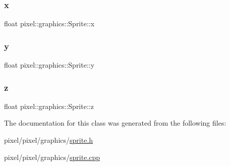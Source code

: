 \subsubsection{\texorpdfstring{x}{x}}
{\footnotesize\ttfamily float pixel\+::graphics\+::\+Sprite\+::x}

\mbox{\label{classpixel_1_1graphics_1_1_sprite_a0ffb75d6a489e6ce3ba76027389d11dd}} 
\subsubsection{\texorpdfstring{y}{y}}
{\footnotesize\ttfamily float pixel\+::graphics\+::\+Sprite\+::y}

\mbox{\label{classpixel_1_1graphics_1_1_sprite_aab4803301c8480b03ab6a62370753694}} 
\subsubsection{\texorpdfstring{z}{z}}
{\footnotesize\ttfamily float pixel\+::graphics\+::\+Sprite\+::z}



The documentation for this class was generated from the following files\+:\begin{DoxyCompactItemize}
\item 
pixel/pixel/graphics/\hyperlink{sprite_8h}{sprite.\+h}\item 
pixel/pixel/graphics/\hyperlink{pixel_2graphics_2sprite_8cpp}{sprite.\+cpp}\end{DoxyCompactItemize}

